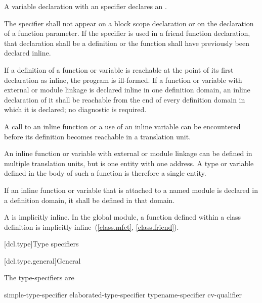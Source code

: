 \pnum
A variable declaration with an  specifier declares an
.

\pnum
The  specifier shall not appear on a block scope declaration or
on the declaration of a function parameter.
If the  specifier is used in a friend function declaration, that
declaration shall be a definition or the function shall have previously
been declared inline.

\pnum
If a definition of a function or variable is reachable
at the point of its
first declaration as inline, the program is ill-formed. If a function or variable
with external or module linkage
is declared inline in one definition domain,
an inline declaration of it shall be reachable
from the end of every definition domain in which it is declared;
no diagnostic is required.
\begin{note}
A call to an inline function or a use of an inline variable can be encountered
before its definition becomes reachable in a translation unit.
\end{note}

\pnum
\begin{note}
An inline function or variable
with external or module linkage
can be defined in multiple translation units,
but is one entity with one address.
A type or  variable
defined in the body of such a function
is therefore a single entity.
\end{note}

\pnum
If an inline function or variable that is attached to a named module
is declared in a definition domain,
it shall be defined in that domain.
\begin{note}
A  is implicitly inline.
In the global module, a function defined within a class definition
is implicitly inline~(\ref{class.mfct}, \ref{class.friend}).
\end{note}

[dcl.type]{Type specifiers}%

[dcl.type.general]{General}%

\pnum
The type-specifiers are
%
%
%
\begin{bnf}
\br
  simple-type-specifier\br
  elaborated-type-specifier\br
  typename-specifier\br
  cv-qualifier
\end{bnf}

